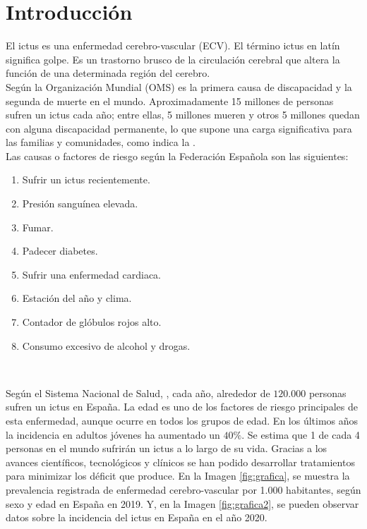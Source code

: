 \chapter{Introducción}
\label{cap:capitulo1}
\setcounter{page}{1}

El ictus es una enfermedad cerebro-vascular (ECV).
El término ictus en latín significa golpe.
Es un trastorno brusco de la circulación cerebral que altera la función de una determinada región del cerebro.\\

Según la Organización Mundial \cite{cita1} (OMS) es la primera causa de discapacidad y la segunda de muerte en el mundo.
Aproximadamente 15 millones de personas sufren un ictus cada año; entre ellas, 5 millones mueren y otros 5 millones quedan con alguna discapacidad permanente, lo que supone una carga significativa para las familias y comunidades, como indica la \cite{cita2}.\\

Las causas o factores de riesgo según la Federación Española \cite{cita3} son las siguientes:
\begin{enumerate}
    \item Sufrir un ictus recientemente.
	\item Presión sanguínea elevada.
	\item Fumar.
	\item Padecer diabetes.
	\item Sufrir una enfermedad cardiaca.
	\item Estación del año y clima.
	\item Contador de glóbulos rojos alto.
	\item Consumo excesivo de alcohol y drogas.\\
\end{enumerate}\

Según el Sistema Nacional de Salud, \cite{perales1a}, cada año, alrededor de $120.000$ personas sufren un ictus en España.
La edad es uno de los factores de riesgo principales de esta enfermedad, aunque ocurre en todos los grupos de edad.
En los últimos años la incidencia en adultos jóvenes ha aumentado un $40\%$.
Se estima que 1 de cada 4 personas en el mundo sufrirán un ictus a lo largo de su vida.
Gracias a los avances científicos, tecnológicos y clínicos se han podido desarrollar tratamientos para minimizar los déficit que produce.
En la Imagen \ref{fig:grafica}, se muestra la prevalencia registrada de enfermedad cerebro-vascular por 1.000 habitantes, según sexo y edad en España en 2019.
Y, en la Imagen \ref{fig:grafica2}, se pueden observar datos sobre la incidencia del ictus en España en el año 2020.\\

